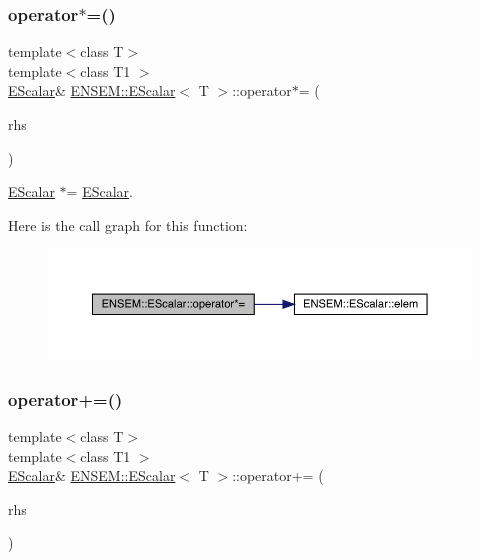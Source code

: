 \subsubsection{\texorpdfstring{operator$\ast$=()}{operator*=()}\hspace{0.1cm}{\footnotesize\ttfamily [2/2]}}
{\footnotesize\ttfamily template$<$class T$>$ \\
template$<$class T1 $>$ \\
\mbox{\hyperlink{classENSEM_1_1EScalar}{E\+Scalar}}\& \mbox{\hyperlink{classENSEM_1_1EScalar}{E\+N\+S\+E\+M\+::\+E\+Scalar}}$<$ T $>$\+::operator$\ast$= (\begin{DoxyParamCaption}\item[{const \mbox{\hyperlink{classENSEM_1_1EScalar}{E\+Scalar}}$<$ T1 $>$ \&}]{rhs }\end{DoxyParamCaption})\hspace{0.3cm}{\ttfamily [inline]}}



\mbox{\hyperlink{classENSEM_1_1EScalar}{E\+Scalar}} $\ast$= \mbox{\hyperlink{classENSEM_1_1EScalar}{E\+Scalar}}. 

Here is the call graph for this function\+:
\nopagebreak
\begin{figure}[H]
\begin{center}
\leavevmode
\includegraphics[width=350pt]{d0/d82/classENSEM_1_1EScalar_aa614bef8258a8ea3c2711c4d7d032c1a_cgraph}
\end{center}
\end{figure}
\mbox{\label{classENSEM_1_1EScalar_aa34f8bd686adb144a6d0e5e8f69787ce}} 
\subsubsection{\texorpdfstring{operator+=()}{operator+=()}\hspace{0.1cm}{\footnotesize\ttfamily [1/2]}}
{\footnotesize\ttfamily template$<$class T$>$ \\
template$<$class T1 $>$ \\
\mbox{\hyperlink{classENSEM_1_1EScalar}{E\+Scalar}}\& \mbox{\hyperlink{classENSEM_1_1EScalar}{E\+N\+S\+E\+M\+::\+E\+Scalar}}$<$ T $>$\+::operator+= (\begin{DoxyParamCaption}\item[{const \mbox{\hyperlink{classENSEM_1_1EScalar}{E\+Scalar}}$<$ T1 $>$ \&}]{rhs }\end{DoxyParamCaption})\hspace{0.3cm}{\ttfamily [inline]}}



